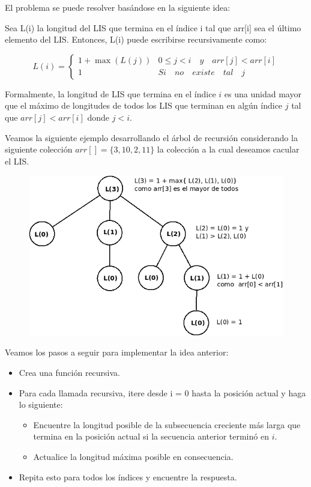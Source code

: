 El problema se puede resolver basándose en la siguiente idea:

Sea L(i) la longitud del LIS que termina en el índice i tal que arr[i] sea el último elemento del LIS. Entonces, L(i) puede escribirse recursivamente como:

$$L(i) = \begin{cases}
	1 + \max(L(j)) &  0 \le j < i \quad y \quad arr[j] < arr[i] \\ 
	
	1 & Si \quad no \quad existe \quad tal \quad j 
\end{cases}$$

Formalmente, la longitud de LIS que termina en el índice $i$ es una unidad mayor que el máximo de longitudes de todos los LIS que terminan en algún índice $j$ tal que $arr[j] < arr[i]$ donde $j < i$.

Veamos la siguiente ejemplo desarrollando el árbol de recursión considerando la siguiente colección $arr[] = \{3, 10, 2, 11\}$ la colección a la cual deseamos cacular el LIS.

\begin{figure}[!h]
	\centering
	\includegraphics[width=0.7\linewidth]{img/list_recursive_tree}
	\label{fig:listrecursivetree}
\end{figure}


Veamos los pasos a seguir para implementar la idea anterior:

\begin{itemize}
	\item Crea una función recursiva.
	\item Para cada llamada recursiva, itere desde i = 0 hasta la posición actual y haga lo siguiente:
	\begin{itemize}
		\item Encuentre la longitud posible de la subsecuencia creciente más larga que termina en la posición actual si la secuencia anterior terminó en $i$.
		\item Actualice la longitud máxima posible en consecuencia.
	\end{itemize}
	\item Repita esto para todos los índices y encuentre la respuesta.
\end{itemize}

